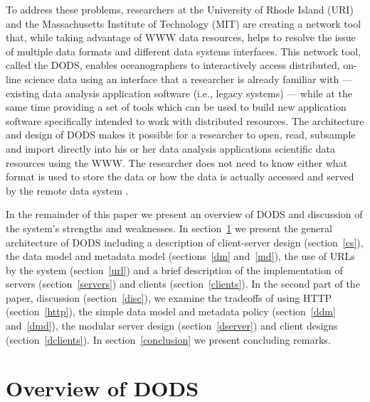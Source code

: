 \documentclass[12pt]{article}
\begin{document}
To address these problems, researchers at the University of Rhode Island 
(URI) and the Massachusetts Institute of Technology (MIT) are creating a 
network tool that,
while taking advantage of \ac{WWW} data resources, helps to resolve the issue
of multiple data formats and different data systems interfaces.  This network
tool, called the \acf{DODS}, enables oceanographers to interactively access
distributed, on-line science data using an interface that a researcher
is already familiar with --- existing data analysis application software (i.e.,
legacy systems) --- while at the same time providing a set of tools which can be
used to build new application software specifically intended to work with
distributed resources.  The architecture and design of \ac{DODS} makes it
possible for a researcher to open, read, subsample and import directly into
his or her data analysis applications scientific data resources using the
\ac{WWW}.  The researcher does not need to know either what format is used to
store the data or how the data is actually accessed and served by the remote
data system \cite{gallagher:dods}.

In the remainder of this paper we present an overview of \ac{DODS} and
discussion of the system's strengths and weaknesses. In
section~\ref{overview} we present the general architecture of \ac{DODS}
including a description of client-server design (section~\ref{cs}), the data
model and metadata model (sections~\ref{dm} and~\ref{md}), the use of
\acs{URL}s by the system (section~\ref{url}) and a brief description of the
implementation of servers (section~\ref{servers}) and clients
(section~\ref{clients}). In the second part of the paper, discussion
(section~\ref{disc}), we examine the tradeoffs of using \acs{HTTP}
(section~\ref{http}), the simple data model and metadata policy
(section~\ref{ddm} and~\ref{dmd}), the modular server design
(section~\ref{dserver}) and client designs (section~\ref{dclients}). In
section~\ref{conclusion} we present concluding remarks.

\section{Overview of \ac{DODS}}
\label{overview}
\end{document}
